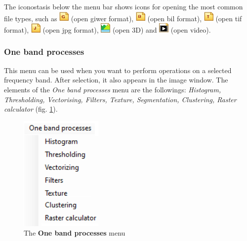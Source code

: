\documentclass[a4paper,12pt]{article}
\begin{document}
The iconostasis below the menu bar shows icons for opening the most common file types, such as \includegraphics [width = 0.5cm] {opengiwer.png} (open giwer format), \includegraphics [width = 0.5cm] {openbil.png} (open bil format), \includegraphics [width = 0.5cm] {opentif.png} (open tif format), \includegraphics [width = 0.5cm] {openjpg.png} (open jpg format), \includegraphics [width = 0.5cm ] {3d.png} (open 3D) and \includegraphics [width = 0.5cm] {openvideo.png} (open video). 


\subsubsection{One band processes}

This menu can be used when you want to perform operations on a selected frequency band. After selection, it also appears in the image window.
The elements of the \textit {One band processes} menu are the followings: \textit {Histogram, Thresholding, Vectorising, Filters, Texture, Segmentation, Clustering, Raster calculator} (fig. \ref {fig:onebandmenu}). 

\begin{figure}
	\centering
	\includegraphics[width=4cm]{onebandmenu.png}
	\caption{The \textbf{One band processes} menu}
	\label{fig:onebandmenu}
\end{figure}
\end{document}
